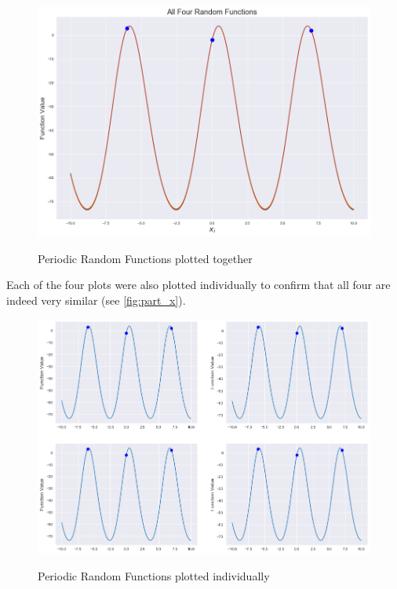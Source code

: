 \documentclass[twoside,11pt]{homework}
\DeclarePairedDelimiter{\2norm}{\lVert}{\rVert^2_2}
\newcommand{\1}[1]{\mathds{1}\left[#1\right]}
\begin{document}
\begin{figure}[H]
\centering
\caption{Periodic Random Functions plotted together}
\includegraphics[scale=0.4]{"../code/figures/part_x_all4"}
\label{fig:part_x}
\end{figure}
\noindent
Each of the four plots were also plotted individually to confirm that all four are indeed very similar (see \autoref{fig:part_x}).

\begin{figure}[H]
\centering
\caption{Periodic Random Functions plotted individually}
\includegraphics[scale=0.4]{"../code/figures/part_x_individual"}
\label{fig:part_x}
\end{figure}




\vspace{0.15in}
\end{document}
